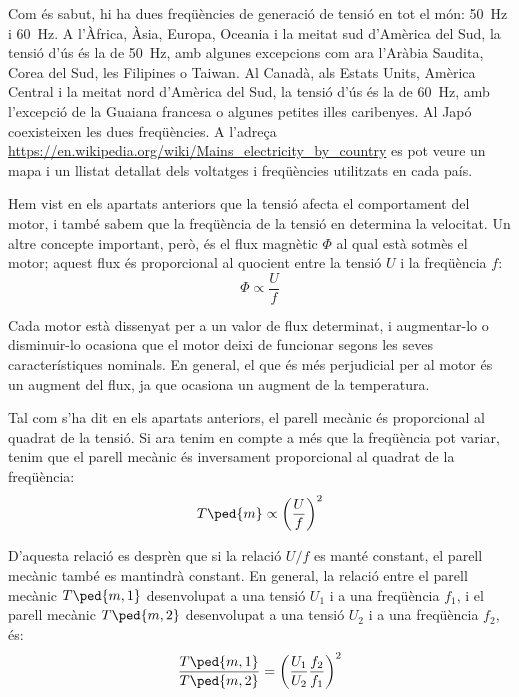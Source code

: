 Com és sabut, hi ha dues freqüències de generació de tensió en tot el món: \qty{50}{Hz} i \qty{60}{Hz}. A l'Àfrica, Àsia, Europa,  Oceania i la meitat sud d'Amèrica del Sud, la tensió d'ús és la de \qty{50}{Hz}, amb algunes excepcions com ara l'Aràbia Saudita, Corea del Sud, les Filipines o Taiwan. Al Canadà, als Estats Units, Amèrica Central i la meitat nord  d'Amèrica del Sud, la tensió d'ús és la de \qty{60}{Hz}, amb l'excepció de la Guaiana francesa o algunes petites illes caribenyes. Al Japó coexisteixen les dues freqüències. A l'adreça \href{https://en.wikipedia.org/wiki/Mains_electricity_by_country}
{https:/\!\!/en.wikipedia.org/wiki/Mains\_electricity\_by\_country} es pot veure un mapa i un llistat detallat dels voltatges i freqüències utilitzats en cada país.

Hem vist en els apartats anteriors que la tensió afecta el comportament del motor, i també sabem que la freqüència de la tensió en determina la velocitat. Un altre concepte important, però, és el flux magnètic $\Phi$ al qual està sotmès el motor; aquest flux és proporcional al quocient entre la tensió $U$ i la freqüència $f$:
\begin{equation}
	\Phi \propto \frac{U}{f}
\end{equation}

Cada motor està dissenyat per a un valor de flux determinat, i augmentar-lo  o disminuir-lo ocasiona que el motor deixi de funcionar segons les seves característiques nominals. En general, el que és més perjudicial per al motor és un augment del flux, ja que  ocasiona un  augment de la temperatura.

Tal com s'ha dit en els apartats anteriors, el parell mecànic és proporcional al quadrat de la tensió. Si ara tenim en compte a més que la freqüència pot variar, tenim que el parell mecànic és inversament proporcional al quadrat de la freqüència:
\begin{equation}
	T\ped{m} \propto {\left(\frac{U}{f}\right)}^2
\end{equation}

D'aquesta relació es desprèn que si la relació $U/f$ es manté constant, el parell mecànic també es mantindrà constant. En general, la relació entre el parell mecànic $T\ped{m,1}$ desenvolupat a una tensió $U_1$ i a una freqüència $f_1$, i el parell mecànic $T\ped{m,2}$ desenvolupat a una tensió $U_2$ i a una freqüència $f_2$, és:
\begin{equation}\label{eq:Tm_U_f}
	\frac{T\ped{m,1}}{T\ped{m,2}}={\left(\frac{{U}_{1}}{{U}_{2}}\frac{{f}_{2}}{{f}_{1}}\right)}^2
\end{equation}

